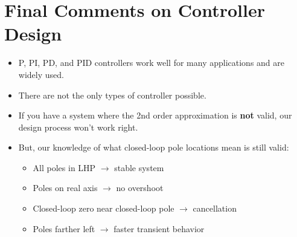 \documentclass{book}
\begin{document}
\section*{Final Comments on Controller Design}
\begin{itemize}
	\item P, PI, PD, and PID controllers work well for many applications and are widely used.
	\item There are not the only types of controller possible.
	\item If you have a system where the 2nd order approximation is \textbf{not} valid, our design process won't work right.
	\item But, our knowledge of what closed-loop pole locations mean is still valid:
	\begin{itemize}
		\item All poles in LHP $ \to $ stable system
		\item Poles on real axis $ \to $ no overshoot
		\item Closed-loop zero near closed-loop pole $ \to $ cancellation
		\item Poles farther left $ \to $ faster transient behavior
	\end{itemize}
\end{itemize}
\end{document}
